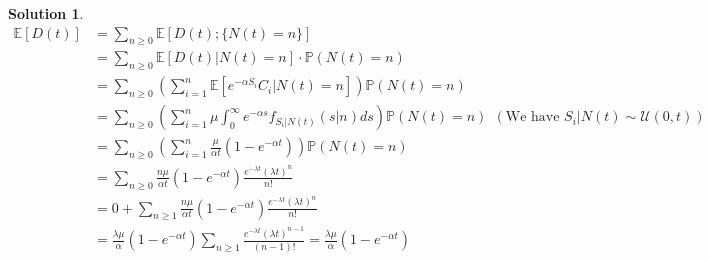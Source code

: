 \documentclass[a4paper, 10pt]{article}
\theoremstyle{definition}
\theoremstyle{hSol}
\newtheorem*{solution}{Solution}
\begin{document}
\begin{solution}
\begin{equation}
  \begin{split}
    \mathbb{E}\left[D(t)\right] &= \sum_{n\geq 0} \mathbb{E}\left[D(t); \{N(t)=n\}\right] \\
    &= \sum_{n\geq 0} \mathbb{E}\left[D(t)|N(t)=n\right] \cdot \mathbb{P}\left(N(t)=n\right)\\
    &= \sum_{n\geq 0} \left(\sum_{i=1}^{n} \mathbb{E}\left[e^{-\alpha S_i}C_i|N(t)=n\right]\right) \mathbb{P}\left(N(t)=n\right)\\
    &= \sum_{n\geq 0} \left(\sum_{i=1}^{n} \mu\int_0^{\infty} e^{-\alpha s}f_{S_i|N(t)}(s|n)ds\right) \mathbb{P}\left(N(t)=n\right)~~(\text{We have $S_i|N(t)\sim \mathcal{U}(0,t)$})\\
    &= \sum_{n\geq 0} \left(\sum_{i=1}^{n} \frac{\mu}{\alpha t}(1-e^{-\alpha t})\right) \mathbb{P}\left(N(t)=n\right)\\
    &= \sum_{n\geq 0} \frac{n\mu}{\alpha t}(1-e^{-\alpha t}) \frac{e^{-\lambda t}(\lambda t)^n}{n!} \\
    &=0+\sum_{n\geq 1} \frac{n\mu}{\alpha t}(1-e^{-\alpha t}) \frac{e^{-\lambda t}(\lambda t)^n}{n!}\\
    &= \frac{\lambda\mu}{\alpha}(1-e^{-\alpha t}) \sum_{n\geq 1} \frac{e^{-\lambda t}(\lambda t)^{n-1}}{(n-1)!} = \frac{\lambda\mu}{\alpha}(1-e^{-\alpha t})\\
  \end{split}
\end{equation}
\end{solution}
\end{document}
